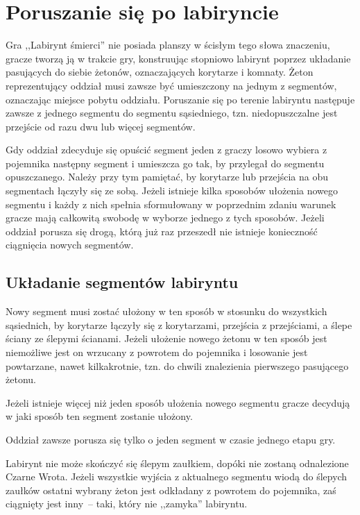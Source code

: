 \section{Poruszanie się po labiryncie}

Gra ,,Labirynt śmierci'' nie posiada planszy w ścisłym tego słowa znaczeniu, gracze tworzą ją w trakcie gry, konstruując stopniowo labirynt poprzez układanie pasujących do siebie żetonów, oznaczających korytarze i komnaty.
Żeton reprezentujący oddział musi zawsze być umieszczony na jednym z segmentów, oznaczając miejsce pobytu oddziału.
Poruszanie się po terenie labiryntu następuje zawsze z jednego segmentu do segmentu sąsiedniego, tzn. niedopuszczalne jest przejście od razu dwu lub więcej segmentów.

Gdy oddział zdecyduje się opuścić segment jeden z graczy losowo wybiera z pojemnika następny segment i umieszcza go tak, by przylegał do segmentu opuszczanego.
Należy przy tym pamiętać, by korytarze lub przejścia na obu segmentach łączyły się ze sobą.
Jeżeli istnieje kilka sposobów ułożenia nowego segmentu i każdy z nich spełnia sformułowany w poprzednim zdaniu warunek gracze mają całkowitą swobodę w wyborze jednego z tych sposobów.
Jeżeli oddział porusza się drogą, którą już raz przeszedł nie istnieje konieczność ciągnięcia nowych segmentów.

\subsection{Układanie segmentów labiryntu}
Nowy segment musi zostać ułożony w ten sposób w stosunku do wszystkich sąsiednich, by korytarze łączyły się z korytarzami, przejścia z przejściami, a ślepe ściany ze ślepymi ścianami.
Jeżeli ułożenie nowego żetonu w ten sposób jest niemożliwe jest on wrzucany z powrotem do pojemnika i losowanie jest powtarzane, nawet kilkakrotnie, tzn. do chwili znalezienia pierwszego pasującego żetonu.

Jeżeli istnieje więcej niż jeden sposób ułożenia nowego segmentu gracze decydują w jaki sposób ten segment zostanie ułożony.

Oddział zawsze porusza się tylko o jeden segment w czasie jednego etapu gry.

Labirynt nie może skończyć się ślepym zaułkiem, dopóki nie zostaną odnalezione Czarne Wrota.
Jeżeli wszystkie wyjścia z aktualnego segmentu wiodą do ślepych zaułków ostatni wybrany żeton jest odkładany z powrotem do pojemnika, zaś ciągnięty jest inny~-- taki, który nie ,,zamyka'' labiryntu.

